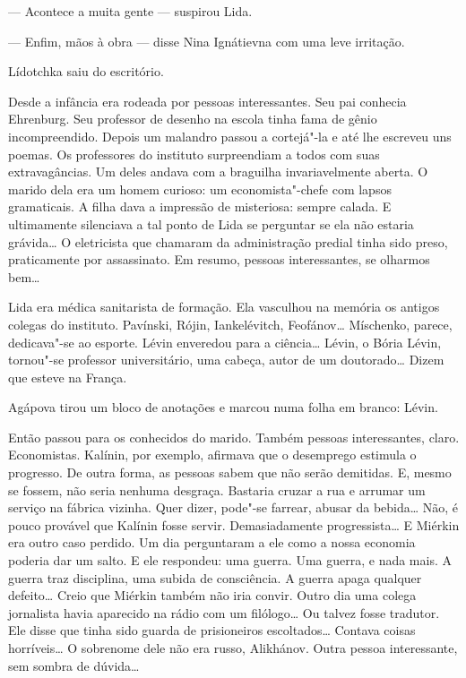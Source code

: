 --- Acontece a muita gente --- suspirou Lida.

--- Enfim, mãos à obra --- disse Nina Ignátievna com uma leve irritação.

Lídotchka saiu do escritório.

Desde a infância era rodeada por pessoas interessantes. Seu pai conhecia
Ehrenburg. Seu professor de desenho na escola tinha fama de gênio
incompreendido. Depois um malandro passou a cortejá"-la e até lhe
escreveu uns poemas. Os professores do instituto surpreendiam a todos
com suas extravagâncias. Um deles andava com a braguilha invariavelmente
aberta. O marido dela era um homem curioso: um economista"-chefe com
lapsos gramaticais. A filha dava a impressão de misteriosa: sempre
calada. E ultimamente silenciava a tal ponto de Lida se perguntar se ela
não estaria grávida\ldots{} O eletricista que chamaram da administração
predial tinha sido preso, praticamente por assassinato. Em resumo,
pessoas interessantes, se olharmos bem\ldots{}

Lida era médica sanitarista de formação. Ela vasculhou na memória os
antigos colegas do instituto. Pavínski, Rójin, Iankelévitch, Feofánov\ldots{}
Míschenko, parece, dedicava"-se ao esporte. Lévin enveredou para a
ciência\ldots{} Lévin, o Bória Lévin, tornou"-se professor universitário, uma
cabeça, autor de um doutorado\ldots{} Dizem que esteve na França.

Agápova tirou um bloco de anotações e marcou numa folha em branco:
Lévin.

Então passou para os conhecidos do marido. Também pessoas interessantes,
claro. Economistas. Kalínin, por exemplo, afirmava que o desemprego
estimula o progresso. De outra forma, as pessoas sabem que não serão
demitidas. E, mesmo se fossem, não seria nenhuma desgraça. Bastaria
cruzar a rua e arrumar um serviço na fábrica vizinha. Quer dizer,
pode"-se farrear, abusar da bebida\ldots{} Não, é pouco provável que Kalínin
fosse servir. Demasiadamente progressista\ldots{} E Miérkin era outro caso
perdido. Um dia perguntaram a ele como a nossa economia poderia dar um
salto. E ele respondeu: uma guerra. Uma guerra, e nada mais. A guerra
traz disciplina, uma subida de consciência. A guerra apaga qualquer
defeito\ldots{} Creio que Miérkin também não iria convir. Outro dia uma \label{ref1}
colega jornalista havia aparecido na rádio com um filólogo\ldots{} Ou talvez
fosse tradutor. Ele disse que tinha sido guarda de prisioneiros
escoltados\ldots{} Contava coisas horríveis\ldots{} O sobrenome dele não era
russo, Alikhánov. Outra pessoa interessante, sem sombra de dúvida\ldots{}

